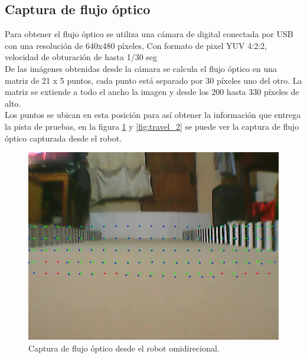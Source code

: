 \documentclass{iccmemoria}
\begin{document}
\subsection{Captura de flujo óptico}

Para obtener el flujo óptico se utiliza una cámara de digital conectada por USB con una resolución de 640x480 píxeles, Con formato de pixel YUV 4:2:2, velocidad de obturación de hasta 1/30 seg\\

De las imágenes obtenidas desde la cámara se calcula el flujo óptico en una matriz de 21 x 5 puntos, cada punto está separado por 30 píxeles uno del otro. La matriz se extiende a todo el ancho la imagen y desde los 200 hasta 330 píxeles de alto.\\

Los puntos se ubican en esta posición para así obtener la información que entrega la pista de pruebas, en la figura \ref{fig:travel_1} y \ref{fig:travel_2} se puede ver la captura de flujo óptico capturada desde el robot.\\

\begin{figure}[H]
  \centering
  \includegraphics[width = 400pt]{images/travel_1.jpeg}
  \caption[Captura flujo óptico.]{Captura de flujo óptico desde el robot omidirecional.}
  \label{fig:travel_1}
\end{figure}
\end{document}
